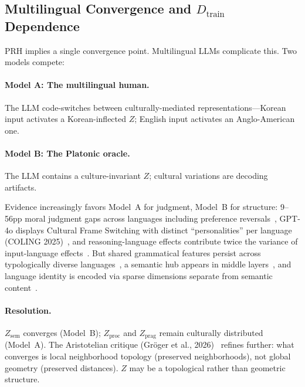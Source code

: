 \documentclass[11pt]{article}
\theoremstyle{definition}
\newcommand{\Zsem}{Z_{\text{sem}}}
\newcommand{\Zproc}{Z_{\text{proc}}}
\newcommand{\Zprag}{Z_{\text{prag}}}
\newcommand{\Dtrain}{D_{\text{train}}}
\begin{document}
\subsection{Multilingual Convergence and $\Dtrain$ Dependence}\label{sec:dtrain}

PRH implies a single convergence point. Multilingual LLMs complicate this. Two models compete:

\paragraph{Model A: The multilingual human.}
The LLM code-switches between culturally-mediated representations---Korean input activates a Korean-inflected $Z$; English input activates an Anglo-American one.

\paragraph{Model B: The Platonic oracle.}
The LLM contains a culture-invariant $Z$; cultural variations are decoding artifacts.

Evidence increasingly favors Model~A for judgment, Model~B for structure: 9--56pp moral judgment gaps across languages including preference reversals~\cite{vida2024moral,agarwal2024ethical}, GPT-4o displays Cultural Frame Switching with distinct ``personalities'' per language (COLING 2025)~\cite{ahn2025coling}, and reasoning-language effects contribute twice the variance of input-language effects~\cite{li2026reasoning}. But shared grammatical features persist across typologically diverse languages~\cite{brinkmann2025shared}, a semantic hub appears in middle layers~\cite{wu2025semantichub}, and language identity is encoded via sparse dimensions separate from semantic content~\cite{zhong2025sparse}.

\paragraph{Resolution.}
$\Zsem$ converges (Model~B); $\Zproc$ and $\Zprag$ remain culturally distributed (Model~A). The Aristotelian critique (Gr\"{o}ger et al., 2026)~\cite{groger2026aristotelian} refines further: what converges is local neighborhood topology (preserved neighborhoods), not global geometry (preserved distances). $Z$ may be a topological rather than geometric structure.
\end{document}
